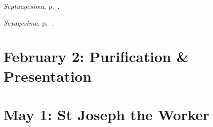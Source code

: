 {{{\emph{Septuagesima}, p.~\pageref{septuagesima}.

\emph{Sexagesima}, p.~\pageref{sexagesima}.
}

\bigskip{}
\benedicamusdomino{}
}


{
\section{February 2: Purification \& Presentation}
\subtitle{ Class, White}
\subtitle{I \& II Vespers}

\def\definevesperspropers{}
\def\definevesperspropersalt{}
\def\vesperspropersnote{At II Vespers:}
\def\vesperspropersaltnote{At I Vespers:}
\def\prechapter{\label{purification-chapter}}
\def\printhymnnote{
  {
    \oldneedspace{3\baselineskip}
    \printnote{Hymn.~\emph{Ave Maris Stella}, p.~\pageref{hymn-avemarisstella}.\\}
  }
}
\bigskip{}
\benedicamusdomino[2]{}
}



{
\section{May 1: St Joseph the Worker}
\subtitle{ Class, White or Gold}
\subtitle{I \& II Vespers}

\def\definevesperspropers{
  \let\oldthing=\maganttranslation
  \def\maganttranslation{\oldthing\pagebreak}
}
\def\definevesperspropersalt{
  \def\vrlinebreak{T}
}
\def\vesperspropersnote{At II Vespers:}
\def\vesperspropersaltnote{At I Vespers:}
\def\prepsalmthreeverses{\vspace{-0.1\baselineskip}}
\def\prerepeatontiphonthree{}

\medskip
\printnote{\sundaycommemnoteeaster{}

}}}
